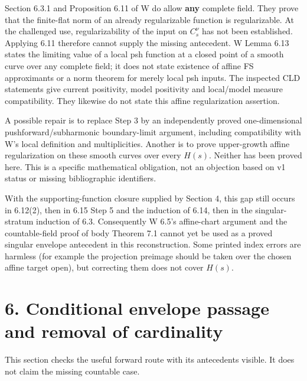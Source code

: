 \documentclass[
  11pt,
]{article}
\begin{document}
Section 6.3.1 and Proposition 6.11 of W do allow \textbf{any} complete
field. They prove that the finite-flat norm of an already regularizable
function is regularizable. At the challenged use, regularizability of
the input on \(C_s^\nu\) has not been established. Applying 6.11
therefore cannot supply the missing antecedent. W Lemma 6.13 states the
limiting value of a local psh function at a closed point of a smooth
curve over any complete field; it does not state existence of affine FS
approximants or a norm theorem for merely local psh inputs. The
inspected CLD statements give current positivity, model positivity and
local/model measure compatibility. They likewise do not state this
affine regularization assertion.

A possible repair is to replace Step 3 by an independently proved
one-dimensional pushforward/subharmonic boundary-limit argument,
including compatibility with W's local definition and multiplicities.
Another is to prove upper-growth affine regularization on these smooth
curves over every \(H(s)\). Neither has been proved here. This is a
specific mathematical obligation, not an objection based on v1 status or
missing bibliographic identifiers.

With the supporting-function closure supplied by Section 4, this gap
still occurs in 6.12(2), then in 6.15 Step 5 and the induction of 6.14,
then in the singular-stratum induction of 6.3. Consequently W 6.5's
affine-chart argument and the countable-field proof of body Theorem 7.1
cannot yet be used as a proved singular envelope antecedent in this
reconstruction. Some printed index errors are harmless (for example the
projection preimage should be taken over the chosen affine target open),
but correcting them does not cover \(H(s)\).

\section{6. Conditional envelope passage and removal of
cardinality}\label{conditional-envelope-passage-and-removal-of-cardinality}

This section checks the useful forward route with its antecedents
visible. It does not claim the missing countable case.
\end{document}

